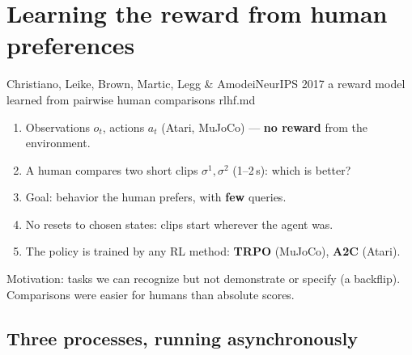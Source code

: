\section{Learning the reward from human preferences}

  {Christiano, Leike, Brown, Martic, Legg \& Amodei}{NeurIPS 2017}
  {a reward model learned from pairwise human comparisons}
  {rlhf.md}

\begin{enumerate}
  \item Observations $o_t$, actions $a_t$ (Atari, MuJoCo) --- \textbf{no reward} from the environment.
  \item A human compares two short clips $\sigma^1,\sigma^2$ (1--2\,s): which is better?
  \item Goal: behavior the human prefers, with \textbf{few} queries.
  \item No resets to chosen states: clips start wherever the agent was.
  \item The policy is trained by any RL method: \textbf{TRPO} (MuJoCo), \textbf{A2C} (Atari).
\end{enumerate}

{\small Motivation: tasks we can recognize but not demonstrate or specify (a backflip). Comparisons were easier for humans than absolute scores.}

\subsection{Three processes, running asynchronously}


